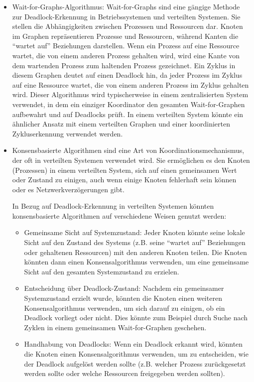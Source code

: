 \begin{itemize}
\item Wait-for-Graphs-Algorithmus: Wait-for-Graphs sind eine gängige Methode zur Deadlock-Erkennung in Betriebssystemen und verteilten Systemen. Sie stellen die Abhängigkeiten zwischen Prozessen und Ressourcen dar. Knoten im Graphen repräsentieren Prozesse und Ressourcen, während Kanten die \enquote{wartet auf} Beziehungen darstellen. Wenn ein Prozess auf eine Ressource wartet, die von einem anderen Prozess gehalten wird, wird eine Kante von dem wartenden Prozess zum haltenden Prozess gezeichnet. Ein Zyklus in diesem Graphen deutet auf einen Deadlock hin, da jeder Prozess im Zyklus auf eine Ressource wartet, die von einem anderen Prozess im Zyklus gehalten wird. Dieser Algorithmus wird typischerweise in einem zentralisierten System verwendet, in dem ein einziger Koordinator den gesamten Wait-for-Graphen aufbewahrt und auf Deadlocks prüft. In einem verteilten System könnte ein ähnlicher Ansatz mit einem verteilten Graphen und einer koordinierten Zykluserkennung verwendet werden.
\item Konsensbasierte Algorithmen sind eine Art von Koordinationsmechanismus, der oft in verteilten Systemen verwendet wird. Sie ermöglichen es den Knoten (Prozessen) in einem verteilten System, sich auf einen gemeinsamen Wert oder Zustand zu einigen, auch wenn einige Knoten fehlerhaft sein können oder es Netzwerkverzögerungen gibt.

In Bezug auf Deadlock-Erkennung in verteilten Systemen könnten konsensbasierte Algorithmen auf verschiedene Weisen genutzt werden:
\begin{itemize}
\item Gemeinsame Sicht auf Systemzustand: Jeder Knoten könnte seine lokale Sicht auf den Zustand des Systems (z.B. seine \enquote{wartet auf} Beziehungen oder gehaltenen Ressourcen) mit den anderen Knoten teilen. Die Knoten könnten dann einen Konsensalgorithmus verwenden, um eine gemeinsame Sicht auf den gesamten Systemzustand zu erzielen.
\item Entscheidung über Deadlock-Zustand: Nachdem ein gemeinsamer Systemzustand erzielt wurde, könnten die Knoten einen weiteren Konsensalgorithmus verwenden, um sich darauf zu einigen, ob ein Deadlock vorliegt oder nicht. Dies könnte zum Beispiel durch Suche nach Zyklen in einem gemeinsamen Wait-for-Graphen geschehen.
\item Handhabung von Deadlocks: Wenn ein Deadlock erkannt wird, könnten die Knoten einen Konsensalgorithmus verwenden, um zu entscheiden, wie der Deadlock aufgelöst werden sollte (z.B. welcher Prozess zurückgesetzt werden sollte oder welche Ressourcen freigegeben werden sollten).
\end{itemize}    
\end{itemize}

